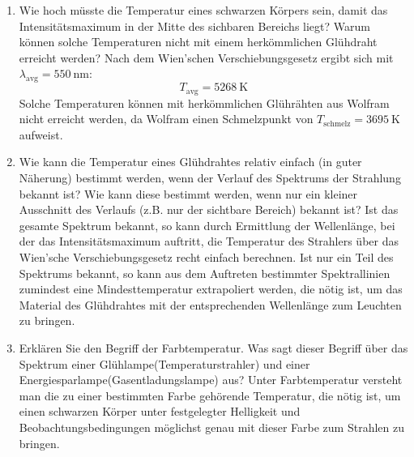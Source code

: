 \begin{enumerate}
	\item Wie hoch müsste die Temperatur eines schwarzen Körpers sein, damit das Intensitätsmaximum in der Mitte des sichbaren Bereichs liegt? Warum können solche Temperaturen nicht mit einem herkömmlichen Glühdraht erreicht werden?
		\subitem Nach dem Wien'schen Verschiebungsgesetz ergibt sich mit $\lambda_{\mathrm{avg}}=\SI{550}{\nano\meter}$:
		\begin{displaymath}
			T_{\mathrm{avg}}=\SI{5268}{\kelvin}
		\end{displaymath}
		Solche Temperaturen können mit herkömmlichen Glührähten aus Wolfram nicht erreicht werden, da Wolfram einen Schmelzpunkt von $T_{\mathrm{schmelz}}=\SI{3695}{\kelvin}$  aufweist.
	\item Wie kann die Temperatur eines Glühdrahtes relativ einfach (in guter Näherung) bestimmt werden, wenn der Verlauf des Spektrums der Strahlung bekannt ist? Wie kann diese bestimmt werden, wenn nur ein kleiner Ausschnitt des Verlaufs (z.B. nur der sichtbare Bereich) bekannt ist?
		\subitem Ist das gesamte Spektrum bekannt, so kann durch Ermittlung der Wellenlänge, bei der das Intensitätsmaximum auftritt, die Temperatur des Strahlers über das Wien'sche Verschiebungsgesetz recht einfach berechnen.
		Ist nur ein Teil des Spektrums bekannt, so kann aus dem Auftreten bestimmter Spektrallinien zumindest eine Mindesttemperatur extrapoliert werden, die nötig ist, um das Material des Glühdrahtes mit der entsprechenden Wellenlänge zum Leuchten zu bringen.
	\item Erklären Sie den Begriff der Farbtemperatur. Was sagt dieser Begriff über das Spektrum einer Glühlampe(Temperaturstrahler) und einer Energiesparlampe(Gasentladungslampe) aus?
		\subitem Unter Farbtemperatur versteht man die zu einer bestimmten Farbe gehörende Temperatur, die nötig ist, um einen schwarzen Körper unter festgelegter Helligkeit und  Beobachtungsbedingungen möglichst genau mit dieser Farbe zum Strahlen zu bringen. 
		

\end{enumerate}
